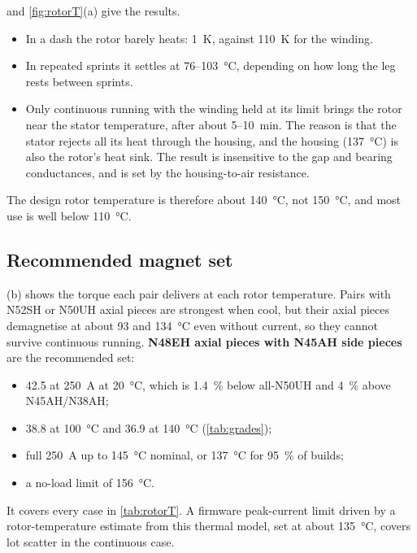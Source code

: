  and \cref{fig:rotorT}(a) give the results.
\begin{itemize}
\item In a dash the rotor barely heats: \SI{1}{K}, against \SI{110}{K} for the winding.
\item In repeated sprints it settles at 76--\SI{103}{\celsius}, depending on how long the leg rests between sprints.
\item Only continuous running with the winding held at its limit brings the rotor near the stator temperature, after about 5--\SI{10}{min}. The reason is that the stator rejects all its heat through the housing, and the housing (\SI{137}{\celsius}) is also the rotor's heat sink. The result is insensitive to the gap and bearing conductances, and is set by the housing-to-air resistance.
\end{itemize}
The design rotor temperature is therefore about \SI{140}{\celsius}, not \SI{150}{\celsius}, and most use is well below \SI{110}{\celsius}.

\subsection{Recommended magnet set}
(b) shows the torque each pair delivers at each rotor temperature. Pairs with N52SH or N50UH axial pieces are strongest when cool, but their axial pieces demagnetise at about 93 and \SI{134}{\celsius} even without current, so they cannot survive continuous running. \textbf{N48EH axial pieces with N45AH side pieces} are the recommended set:
\begin{itemize}
\item \SI{42.5}{\Nm} at \SI{250}{A} at \SI{20}{\celsius}, which is \SI{1.4}{\percent} below all-N50UH and \SI{4}{\percent} above N45AH/N38AH;
\item \SI{38.8}{\Nm} at \SI{100}{\celsius} and \SI{36.9}{\Nm} at \SI{140}{\celsius} (\cref{tab:grades});
\item full \SI{250}{A} up to \SI{145}{\celsius} nominal, or \SI{137}{\celsius} for \SI{95}{\percent} of builds;
\item a no-load limit of \SI{156}{\celsius}.
\end{itemize}
It covers every case in \cref{tab:rotorT}. A firmware peak-current limit driven by a rotor-temperature estimate from this thermal model, set at about \SI{135}{\celsius}, covers lot scatter in the continuous case.

